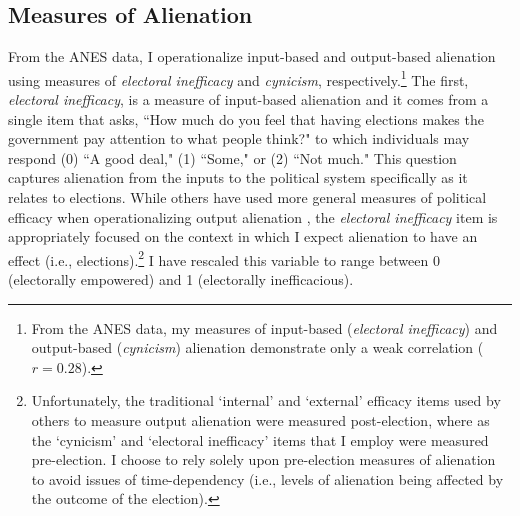 \documentclass[12pt]{article}
\begin{document}
\subsection{Measures of Alienation}
From the ANES data, I operationalize input-based and output-based alienation using measures of \textit{electoral inefficacy} and \textit{cynicism}, respectively.\footnote{From the ANES data, my measures of input-based (\textit{electoral inefficacy}) and output-based (\textit{cynicism}) alienation demonstrate only a weak correlation ($r = 0.28$).} The first, \textit{electoral inefficacy}, is a measure of input-based alienation and it comes from a single item that asks, ``How much do you feel that having elections makes the government pay attention to what people think?" to which individuals may respond (0) ``A good deal," (1) ``Some," or (2) ``Not much." This question captures alienation from the inputs to the political system specifically as it relates to elections. While others have used more general measures of political efficacy when operationalizing output alienation \parencite[e.g.,][]{aberbach1969alienation}, the \textit{electoral inefficacy} item is appropriately focused on the context in which I expect alienation to have an effect (i.e., elections).\footnote{Unfortunately, the traditional `internal' and `external' efficacy items used by others to measure output alienation \parencite[e.g.,][]{fox2020political,southwell1998electoral} were measured post-election, where as the `cynicism' and `electoral inefficacy' items that I employ were measured pre-election. I choose to rely solely upon pre-election measures of alienation to avoid issues of time-dependency (i.e., levels of alienation being affected by the outcome of the election).} I have rescaled this variable to range between 0 (electorally empowered) and 1 (electorally inefficacious).  
\end{document}
